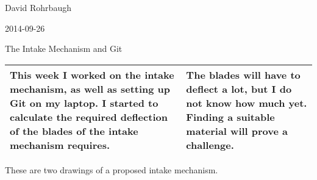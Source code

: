 David Rohrbaugh

2014-09-26

The Intake Mechanism and Git

\begin{tabular}{|p{5cm}|p{5cm}|}
 \hline
 This week I worked on the intake mechanism, as well as setting up Git on my laptop. I started to calculate the required deflection of the blades of the intake mechanism requires.
 &
 The blades will have to deflect a lot, but I do not know how much yet. Finding a suitable material will prove a challenge.
 \\
 \hline
\end{tabular}

These are two drawings of a proposed intake mechanism.
